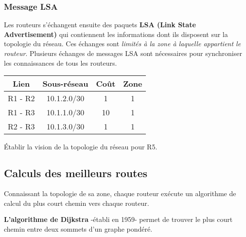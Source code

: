 \documentclass[a4paper,11pt]{article}
\begin{document}
\subsubsection{Message LSA}
Les routeurs s'échangent ensuite des paquets \textbf{LSA (Link State Advertisement)} qui contiennent les informations dont ils disposent sur la topologie du réseau. Ces échanges sont \emph{limités à la zone à laquelle appartient le routeur}. Plusieurs échanges de messages LSA sont nécessaires pour synchroniser les connaissances de tous les routeurs.
\begin{center}
    \begin{tabular}{|*{4}{c|}}
        \hline
        Lien & Sous-réseau & Coût & Zone \\
        \hline
        R1 - R2 & 10.1.2.0/30 & 1 & 1 \\
        \hline
        R1 - R3 & 10.1.1.0/30 & 10 & 1 \\
        \hline
        R2 - R3 & 10.1.3.0/30 & 1 & 1 \\
        \hline
    \end{tabular}
\end{center}
\begin{activite}
Établir la vision de la topologie du réseau pour R5.
\end{activite}
\subsection{Calculs des meilleurs routes}
Connaissant la topologie de sa zone, chaque routeur exécute un algorithme de calcul du plus court chemin vers chaque routeur.
\begin{aretenir}[]
\textbf{L'algorithme de Dijkstra} -établi en 1959- permet de trouver le plus court chemin entre deux sommets d'un graphe pondéré.
\end{aretenir}
\begin{center}
    \label{zone2}
\end{center}
\end{document}
